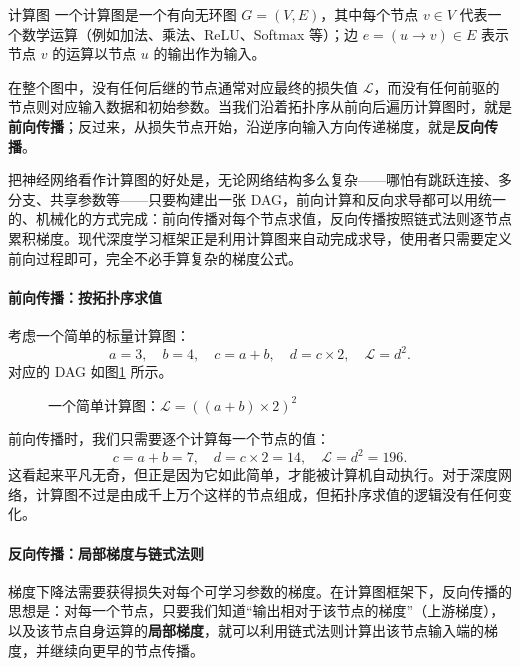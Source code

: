 \begin{definition}{计算图}{}
    一个计算图是一个有向无环图 $G=(V,E)$，其中每个节点 $v\in V$ 代表一个数学运算（例如加法、乘法、ReLU、Softmax 等）；边 $e=(u\to v)\in E$ 表示节点 $v$ 的运算以节点 $u$ 的输出作为输入。
\end{definition}

在整个图中，没有任何后继的节点通常对应最终的损失值 $\mathcal{L}$，而没有任何前驱的节点则对应输入数据和初始参数。当我们沿着拓扑序从前向后遍历计算图时，就是\textbf{前向传播}；反过来，从损失节点开始，沿逆序向输入方向传递梯度，就是\textbf{反向传播}。

把神经网络看作计算图的好处是，无论网络结构多么复杂——哪怕有跳跃连接、多分支、共享参数等——只要构建出一张 DAG，前向计算和反向求导都可以用统一的、机械化的方式完成：前向传播对每个节点求值，反向传播按照链式法则逐节点累积梯度。现代深度学习框架正是利用计算图来自动完成求导，使用者只需要定义前向过程即可，完全不必手算复杂的梯度公式\cite{baydin2018automatic}。

\paragraph{前向传播：按拓扑序求值}

考虑一个简单的标量计算图：
\[
    a = 3,\quad b = 4,\quad c = a + b,\quad d = c \times 2,\quad \mathcal{L} = d^2.
\]
对应的 DAG 如图\cref{fig:simple_computation_graph} 所示。

\begin{figure}[htbp]
    \centering
    
    \caption{一个简单计算图：$\mathcal{L} = ((a+b)\times 2)^2$}
    \label{fig:simple_computation_graph}
\end{figure}

前向传播时，我们只需要逐个计算每一个节点的值：
\[
    c = a + b = 7,\quad d = c \times 2 = 14,\quad \mathcal{L} = d^2 = 196.
\]
这看起来平凡无奇，但正是因为它如此简单，才能被计算机自动执行。对于深度网络，计算图不过是由成千上万个这样的节点组成，但拓扑序求值的逻辑没有任何变化。

\paragraph{反向传播：局部梯度与链式法则}

梯度下降法需要获得损失对每个可学习参数的梯度。在计算图框架下，反向传播的思想是：对每一个节点，只要我们知道“输出相对于该节点的梯度”（上游梯度），以及该节点自身运算的\textbf{局部梯度}，就可以利用链式法则计算出该节点输入端的梯度，并继续向更早的节点传播。

